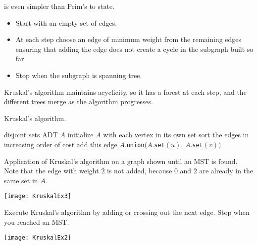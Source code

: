  is even simpler than Prim's to state.
\begin{itemize}
\item Start with an empty set of edges.
\item At each step choose an edge of minimum weight from the remaining edges ensuring 
that adding the edge does not create a cycle in the subgraph built so far. 
\item Stop when the subgraph is spanning tree.
\end{itemize}

Kruskal's algorithm maintains acyclicity, so it has a forest
at each step, and the different trees merge as the algorithm progresses.

\begin{algorithm}[H]
  \caption{Kruskal's algorithm.}
  \label{alg:kruskal}
\begin{algorithmic}[1]
	\State disjoint sets ADT $A$
	\State initialize $A$ with each vertex in its own set
	\State sort the edges in increasing order of cost
			\State add this edge
			\State $A$.\texttt{union}$(A$.\texttt{set}$(u)$, $A$.\texttt{set}$(v))$
		\EndIf
	\EndFor
	\State {}
\EndFunction
\end{algorithmic}
\end{algorithm}

\begin{Boxample}
Application of Kruskal's algorithm on a graph shown until an MST is found. 
Note that the edge  with weight $2$ is not added, 
because $0$ and $2$ are already in the same set in $A$.\\
\begin{center}
\texttt{[image: KruskalEx3]}
\end{center}
\end{Boxample}

\begin{Boxample}[0.2]
Execute Kruskal's algorithm by adding or crossing out the next edge. Stop when you reached an MST.\\

\begin{center}
\texttt{[image: KruskalEx2]}
\end{center}
\end{Boxample}


